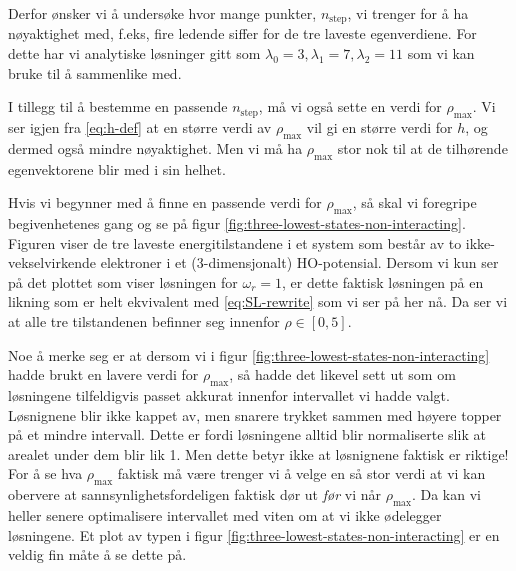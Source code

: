 \documentclass[11pt]{article}
\begin{document}
Derfor ønsker vi å undersøke hvor mange punkter, $n_\text{step}$, vi
trenger for å ha nøyaktighet med, f.eks, fire ledende siffer for de
tre laveste egenverdiene. For dette har vi analytiske løsninger gitt
som $\lambda_0=3,\lambda_1=7,\lambda_2=11$ som vi kan bruke til å
sammenlike med. 

I tillegg til å bestemme en passende
$n_\text{step}$, må vi også sette en verdi for $\rho_\text{max}$. Vi
ser igjen fra \eqref{eq:h-def} at en større verdi av $\rho_\text{max}$
vil gi en større verdi for $h$, og dermed også mindre nøyaktighet. Men
vi må ha $\rho_\text{max}$ stor nok til at de tilhørende egenvektorene
blir med i sin helhet. 

Hvis vi begynner med å finne en passende verdi for $\rho_\text{max}$,
så skal vi foregripe begivenhetenes gang og se på figur
\ref{fig:three-lowest-states-non-interacting}. Figuren viser de tre
laveste energitilstandene i et system som består av to
ikke-vekselvirkende elektroner i et (3-dimensjonalt)
HO-potensial. Dersom vi kun ser på det plottet som viser løsningen for
$\omega_r=1$, er dette faktisk løsningen på en likning som er helt
ekvivalent med \eqref{eq:SL-rewrite} som vi ser på her nå. Da ser vi
at alle tre tilstandenen befinner seg innenfor $\rho\in[0,5]$. 

Noe å merke seg er at dersom vi i figur
\ref{fig:three-lowest-states-non-interacting} hadde brukt en lavere
verdi for $\rho_\text{max}$, så hadde det likevel sett ut som om
løsningene tilfeldigvis passet akkurat innenfor intervallet vi hadde
valgt. Løsnignene blir ikke kappet av, men snarere trykket sammen med
høyere topper på et mindre intervall. Dette er fordi løsningene alltid
blir normaliserte slik at arealet under dem blir lik 1. Men dette
betyr ikke at løsnignene faktisk er riktige! For å se hva
$\rho_\text{max}$ faktisk må være trenger vi å velge en så stor verdi
at vi kan obervere at sannsynlighetsfordeligen faktisk dør ut
\emph{før} vi når $\rho_\text{max}$. Da kan vi heller senere
optimalisere intervallet med viten om at vi ikke ødelegger
løsningene. Et plot av typen i figur
\ref{fig:three-lowest-states-non-interacting} er en veldig fin måte å
se dette på. 
\end{document}
